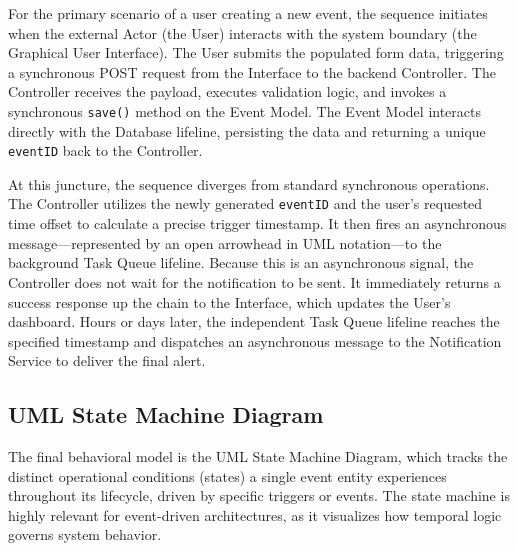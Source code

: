 For the primary scenario of a user creating a new event, the sequence initiates when the external Actor (the User) interacts with the system boundary (the Graphical User Interface). The User submits the populated form data, triggering a synchronous POST request from the Interface to the backend Controller. The Controller receives the payload, executes validation logic, and invokes a synchronous \texttt{save()} method on the Event Model. The Event Model interacts directly with the Database lifeline, persisting the data and returning a unique \texttt{eventID} back to the Controller.

At this juncture, the sequence diverges from standard synchronous operations. The Controller utilizes the newly generated \texttt{eventID} and the user's requested time offset to calculate a precise trigger timestamp. It then fires an asynchronous message—represented by an open arrowhead in UML notation—to the background Task Queue lifeline. Because this is an asynchronous signal, the Controller does not wait for the notification to be sent. It immediately returns a success response up the chain to the Interface, which updates the User's dashboard. Hours or days later, the independent Task Queue lifeline reaches the specified timestamp and dispatches an asynchronous message to the Notification Service to deliver the final alert.

\subsection{UML State Machine Diagram}

The final behavioral model is the UML State Machine Diagram, which tracks the distinct operational conditions (states) a single event entity experiences throughout its lifecycle, driven by specific triggers or events. The state machine is highly relevant for event-driven architectures, as it visualizes how temporal logic governs system behavior.

